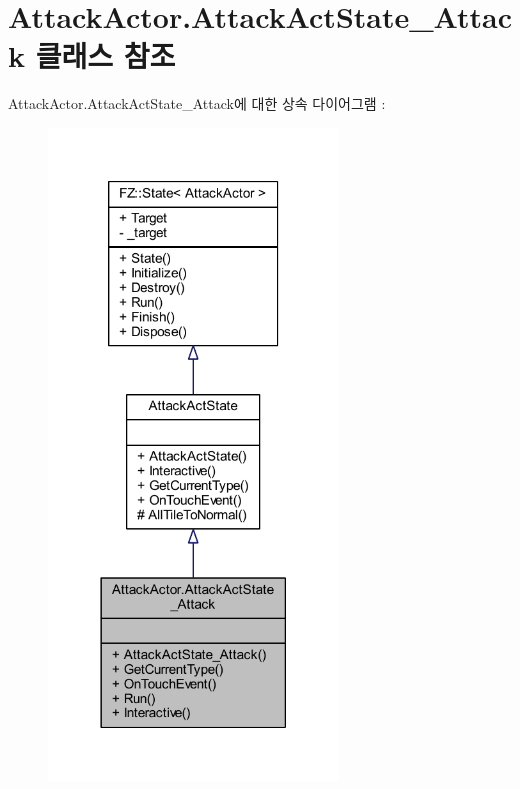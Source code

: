 \hypertarget{class_attack_actor_1_1_attack_act_state___attack}{}\section{Attack\+Actor.\+Attack\+Act\+State\+\_\+\+Attack 클래스 참조}
\label{class_attack_actor_1_1_attack_act_state___attack}


Attack\+Actor.\+Attack\+Act\+State\+\_\+\+Attack에 대한 상속 다이어그램 \+: 
\nopagebreak
\begin{figure}[H]
\begin{center}
\leavevmode
\includegraphics[width=218pt]{class_attack_actor_1_1_attack_act_state___attack__inherit__graph}
\end{center}
\end{figure}


